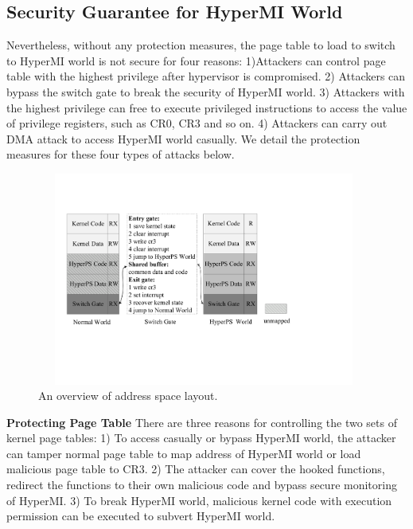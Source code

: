 \documentclass[conference]{IEEEtran}
\begin{document}
\subsection{Security Guarantee for HyperMI World}\label {SG}
Nevertheless, without any protection measures, the page table to load to switch to HyperMI world is not secure for four reasons: 1)Attackers can control page table with the highest privilege after hypervisor is compromised. 2) Attackers can bypass the switch gate to break the security of HyperMI world. 3) Attackers with the highest privilege can free to execute privileged instructions to access the value of privilege registers, such as CR0, CR3 and so on. 4) Attackers can carry out DMA attack to access HyperMI world casually.
We detail the protection measures for these four types of attacks below.

\begin{figure}
\centerline{\includegraphics[width=11cm, height=7cm]{pdfvmcs2.pdf}}%
\caption{An overview of address space layout.} \label{fig2}
\end{figure}

\textbf{Protecting Page Table}
There are three reasons for controlling the two sets of kernel page tables: 1) To access casually or bypass HyperMI world, the attacker can tamper normal page table to map address of HyperMI world or load malicious page table to CR3.
2) The attacker can cover the hooked functions, redirect the functions to their own malicious code and bypass secure monitoring of HyperMI. 3) To break HyperMI world, malicious kernel code with execution permission can be executed to subvert HyperMI world.
\end{document}
